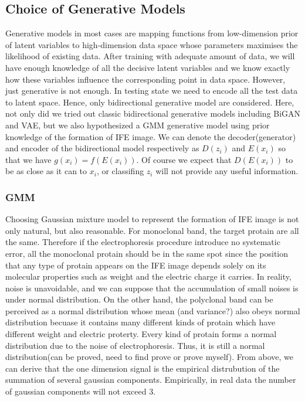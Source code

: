 \documentclass[letterpaper]{article}
\begin{document}
\subsection{Choice of Generative Models}
Generative models in most cases are mapping functions from low-dimension prior of latent variables to high-dimension data space whose parameters maximises the likelihood of existing data\cite{goodfellow2016nips}. After training with adequate amount of data, we will have enough knowledge of all the decisive latent variables and we know exactly how these variables influence the corresponding point in data space. However, just generative is not enough. In testing state we need to encode all the test data to latent space. Hence, only bidirectional generative model are considered. Here, not only did we tried out classic bidirectional generative models including BiGAN and VAE, but we also hypothesized a GMM generative model using prior knowledge of the formation of IFE image. We can denote the decoder(generator) and encoder of the bidirectional model respectively as $D(z_i)$ and $E(x_i)$ so that we have $g(x_i)=f(E(x_i))$. Of course we expect that $D(E(x_i))$ to be as close as it can to $x_i$, or classifing $z_i$ will not provide any useful information.

\subsubsection{GMM}
Choosing Gaussian mixture model to represent the formation of IFE image is not only natural, but also reasonable. For monoclonal band, the target protain are all the same. Therefore if the electrophoresis procedure introduce no systematic error, all the monoclonal protain should be in the same spot since the position that any type of protain appears on the IFE image depends solely on its molecular properties such as weight and the electric charge it carries. In reality, noise is unavoidable, and we can suppose that the accumulation of small noises is under normal distribution. On the other hand, the polyclonal band can be perceived as a normal distribution whose mean (and variance?) also obeys normal distribution becuase it contains many different kinds of protain which have different weight and electric proterty. Every kind of protain forms a normal distribution due to the noise of electrophoresis. Thus, it is still a normal distribution(can be proved, need to find prove or prove myself). From above, we can derive that the one dimension signal is the empirical distrubution of the summation of several gaussian components. Empirically, in real data the number of gaussian components will not exceed 3.
\end{document}

